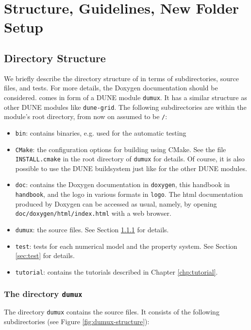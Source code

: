 \chapter{Structure, Guidelines, New Folder Setup}

\section{Directory Structure}

We briefly describe the directory structure of \Dumux in terms 
of subdirectories, source files, and tests. For more details, 
the Doxygen documentation should be considered. 
\Dumux comes in form of a DUNE module \texttt{dumux}. 
It has a similar structure as other DUNE modules like \texttt{dune-grid}. 
The following subdirectories are within the module's root directory, 
from now on assumed to be \texttt{/}: 
\begin{itemize}
\item \texttt{bin}: contains binaries, e.g. used for the automatic testing
\item \texttt{CMake}: the configuration options 
for building \Dumux using CMake. See the file \texttt{INSTALL.cmake} in 
the root directory of \texttt{dumux} for details. Of course, 
it is also possible to use the DUNE buildsystem just like for the other 
DUNE modules.
\item \texttt{doc}: contains the Doxygen documentation in \texttt{doxygen}, 
this handbook in \texttt{handbook}, and the \Dumux logo in various formats in 
\texttt{logo}. The html documentation produced by Doxygen can be accessed as usual, 
namely, by opening \texttt{doc/doxygen/html/index.html} with a web browser. 
\item \texttt{dumux}: the \Dumux source files. See Section \ref{sec:dumux} for details. 
\item \texttt{test}: tests for each numerical model and the property system. 
See Section \ref{sec:test} for details. 
\item \texttt{tutorial}: contains the tutorials described in Chapter \ref{chp:tutorial}. 
\end{itemize}



\subsection{The directory \texttt{dumux}}\label{sec:dumux}

The directory \texttt{dumux} contains the \Dumux source files. It consists of the following subdirectories (see Figure \ref{fig:dumux-structure}): 

